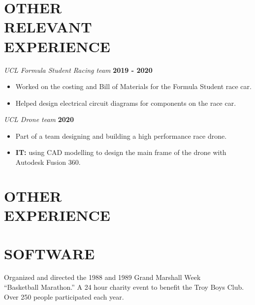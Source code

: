 \documentclass[margin, 10pt]{res} %
\begin{document}
\begin{resume}

\section{OTHER \\RELEVANT \\EXPERIENCE} 

{\sl UCL Formula Student Racing team} \hfill \textbf{2019 - 2020}
\begin{itemize}
  \item Worked on the costing and Bill of Materials for the Formula Student race car.
  \item Helped design electrical circuit diagrams for components on the race car.
\end{itemize}

{\sl UCL Drone team} \hfill \textbf{2020}
\begin{itemize}
  \item Part of a team designing and building a high performance race drone. 
  \item \textbf{IT:} using CAD modelling to design the main frame of the drone with Autodesk Fusion 360.
\end{itemize}
 
 
\section{OTHER \\ EXPERIENCE}


\section{SOFTWARE}

Organized and directed the 1988 and 1989 Grand Marshall Week \\
``Basketball Marathon.'' A 24 hour charity event to benefit the Troy Boys Club. Over 250 people participated each year. 


\end{resume}
\end{document}

